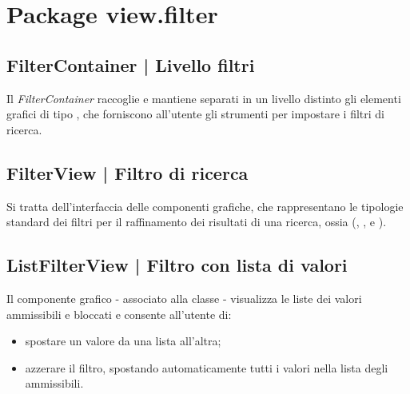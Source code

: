 \documentclass[10pt,a4paper,headinclude,footinclude,hidelinks]{scrreprt} %
\begin{document}
	\section{Package view.filter}
	\label{sec:stage:design:sistema:view.filter}

	\subsection[FilterContainer]{FilterContainer | Livello filtri}
	Il \textit{FilterContainer} raccoglie e mantiene separati in un livello distinto gli elementi grafici di tipo \textit{}, che forniscono all'utente gli strumenti per impostare i filtri di ricerca.
	

	\subsection[FilterView]{FilterView | Filtro di ricerca}
	\label{sec:stage:design:sistema:view.filter:filter}
	Si tratta dell'interfaccia delle componenti grafiche, che rappresentano le tipologie standard dei filtri per il raffinamento dei risultati di una ricerca, ossia (\textit{}, \textit{}, \textit{} e \textit{}).

	\subsection[ListFilterView]{ListFilterView | Filtro con lista di valori}
	\label{sec:stage:design:sistema:view.filter:list-filter}
	Il componente grafico - associato alla classe \textit{} - visualizza le liste dei valori ammissibili e bloccati e consente all'utente di:
	\begin{itemize}
	\item spostare un valore da una lista all'altra;
	\item azzerare il filtro, spostando automaticamente tutti i valori nella lista degli ammissibili.
	\end{itemize}
\end{document}
